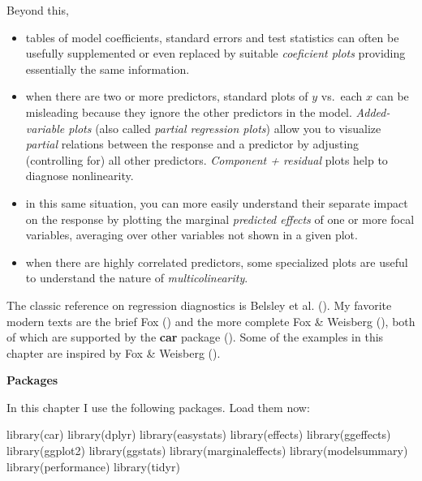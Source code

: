 \documentclass[
  letterpaper,
  10pt,
  krantz2]{krantz}
\makeatletter
\newenvironment{Shaded}{\begin{snugshade}}{\end{snugshade}}
\newcommand{\FunctionTok}[1]{\textcolor[rgb]{0.28,0.35,0.67}{#1}}
\newcommand{\NormalTok}[1]{\textcolor[rgb]{0.00,0.23,0.31}{#1}}
\newenvironment{kframe}{%
  \medskip{}
  \setlength{\fboxsep}{.8em}
  \def\at@end@of@kframe{}%
  \ifinner\ifhmode%
  \def\at@end@of@kframe{\end{minipage}}%
  \begin{minipage}{\columnwidth}%
  \fi\fi%
  \def\FrameCommand##1{\hskip\@totalleftmargin \hskip-\fboxsep
  \colorbox{shadecolor}{##1}\hskip-\fboxsep
      \hskip-\linewidth \hskip-\@totalleftmargin \hskip\columnwidth}%
  \MakeFramed {\advance\hsize-\width
    \@totalleftmargin\z@ \linewidth\hsize
    \@setminipage}}%
{\par\unskip\endMakeFramed%
  \at@end@of@kframe}
\renewenvironment{Shaded}{\begin{kframe}}{\end{kframe}}
\makeatother
\begin{document}
Beyond this,

\begin{itemize}
\item
  tables of model coefficients, standard errors and test statistics can
  often be usefully supplemented or even replaced by suitable
  \emph{coeficient plots} providing essentially the same information.
\item
  when there are two or more predictors, standard plots of \(y\)
  vs.~each \(x\) can be misleading because they ignore the other
  predictors in the model. \emph{Added-variable plots} (also called
  \emph{partial regression plots}) allow you to visualize \emph{partial}
  relations between the response and a predictor by adjusting
  (controlling for) all other predictors. \emph{Component + residual}
  plots help to diagnose nonlinearity.
\item
  in this same situation, you can more easily understand their separate
  impact on the response by plotting the marginal \emph{predicted
  effects} of one or more focal variables, averaging over other
  variables not shown in a given plot.
\item
  when there are highly correlated predictors, some specialized plots
  are useful to understand the nature of \emph{multicolinearity}.
\end{itemize}

The classic reference on regression diagnostics is Belsley et al.
(). My favorite modern texts are the
brief Fox () and the more complete Fox \&
Weisberg (), both of which are
supported by the \textbf{car} package (). Some of the examples in this chapter are inspired by Fox \&
Weisberg ().

\textbf{Packages}

In this chapter I use the following packages. Load them now:

\begin{Shaded}
\begin{Highlighting}[]
\FunctionTok{library}\NormalTok{(car)}
\FunctionTok{library}\NormalTok{(dplyr)}
\FunctionTok{library}\NormalTok{(easystats)}
\FunctionTok{library}\NormalTok{(effects)}
\FunctionTok{library}\NormalTok{(ggeffects)}
\FunctionTok{library}\NormalTok{(ggplot2)}
\FunctionTok{library}\NormalTok{(ggstats)}
\FunctionTok{library}\NormalTok{(marginaleffects)}
\FunctionTok{library}\NormalTok{(modelsummary)}
\FunctionTok{library}\NormalTok{(performance)}
\FunctionTok{library}\NormalTok{(tidyr)}
\end{Highlighting}
\end{Shaded}
\end{document}
